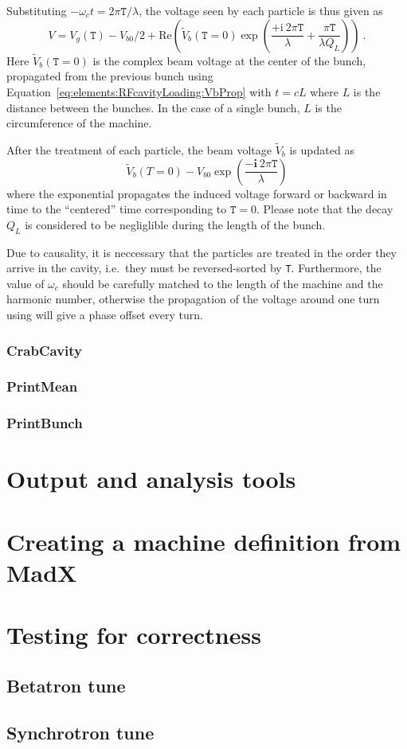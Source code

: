 \documentclass[a4paper]{report}
\begin{document}
Substituting $-\omega_c t = 2\pi \mathtt{T} / \lambda$, the voltage seen by each particle is thus given as
\begin{equation}
  V = V_g(\mathtt{T}) - V_{b0}/2 + \mathrm{Re}\left( \tilde V_b(\mathtt{T}=0) \exp\left(\frac{+\mathrm{i}~2\pi \mathtt{T}}{\lambda} + \frac{\pi \mathtt{T}}{\lambda Q_L} \right) \right)~.
\end{equation}
Here $\tilde V_b(\mathtt{T}=0)$ is the complex beam voltage at the center of the bunch, propagated from the previous bunch using Equation~\eqref{eq:elements:RFcavityLoading:VbProp} with $t=cL$ where $L$ is the distance between the bunches.
In the case of a single bunch, $L$ is the circumference of the machine.

After the treatment of each particle, the beam voltage $\tilde V_b$ is updated as
\begin{equation}
  \tilde V_b(T=0) - V_{b0} \exp \left( \frac{- \mathbf{i} ~ 2\pi \mathtt{T}}{\lambda}  \right)
\end{equation}
where the exponential propagates the induced voltage forward or backward in time to the ``centered'' time corresponding to $\mathtt{T}=0$.
Please note that the decay $Q_L$ is considered to be negliglible during the length of the bunch.

Due to causality, it is neccessary that the particles are treated in the order they arrive in the cavity, i.e.\ they must be reversed-sorted by \texttt{T}.
Furthermore, the value of $\omega_c$ should be carefully matched to the length of the machine and the harmonic number, otherwise the propagation of the voltage around one turn using \label{eq:elements:RFcavityLoading:VbProp} will give a phase offset every turn.



\subsection{CrabCavity}
\subsection{PrintMean}
\subsection{PrintBunch}

\chapter{Output and analysis tools}

\appendix
\chapter{Creating a machine definition from MadX}
\label{sec:MadX}

\chapter{Testing for correctness}
\section{Betatron tune}

\section{Synchrotron tune}
\end{document}
